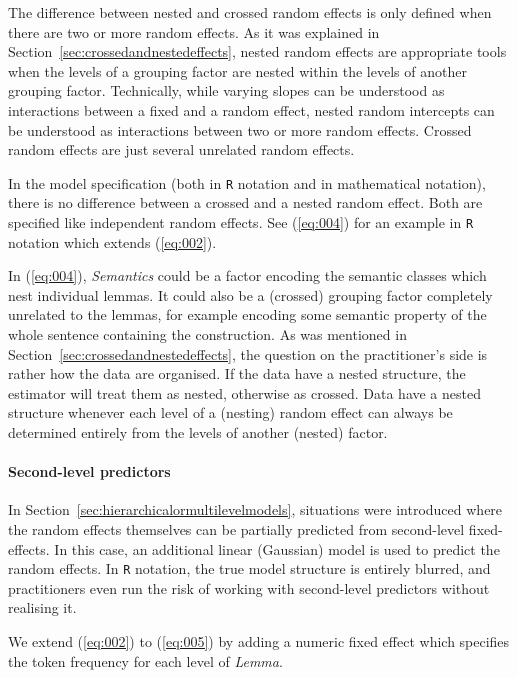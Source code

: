 The difference between nested and crossed random effects is only defined when there are two or more random effects.
As it was explained in Section~\ref{sec:crossedandnestedeffects}, nested random effects are appropriate tools when the levels of a grouping factor are nested within the levels of another grouping factor.
Technically, while varying slopes can be understood as interactions between a fixed and a random effect, nested random intercepts can be understood as interactions between two or more random effects.
Crossed random effects are just several unrelated random effects.

In the model specification (both in \texttt{R} notation and in mathematical notation), there is no difference between a crossed and a nested random effect.
Both are specified like independent random effects.
See (\ref{eq:004}) for an example in \texttt{R} notation which extends (\ref{eq:002}).


In (\ref{eq:004}), \textit{Semantics} could be a factor encoding the semantic classes which nest individual lemmas.
It could also be a (crossed) grouping factor completely unrelated to the lemmas, for example encoding some semantic property of the whole sentence containing the construction.
As was mentioned in Section~\ref{sec:crossedandnestedeffects}, the question on the practitioner's side is rather how the data are organised.
If the data have a nested structure, the estimator will treat them as nested, otherwise as crossed.
Data have a nested structure whenever each level of a (nesting) random effect can always be determined entirely from the levels of another (nested) factor.


\paragraph{Second-level predictors}

In Section~\ref{sec:hierarchicalormultilevelmodels}, situations were introduced where the random effects themselves can be partially predicted from second-level fixed-effects.
In this case, an additional linear (Gaussian) model is used to predict the random effects.
In \texttt{R} notation, the true model structure is entirely blurred, and practitioners even run the risk of working with second-level predictors without realising it.

We extend (\ref{eq:002}) to (\ref{eq:005}) by adding a numeric fixed effect which specifies the token frequency for each level of \textit{Lemma}.

